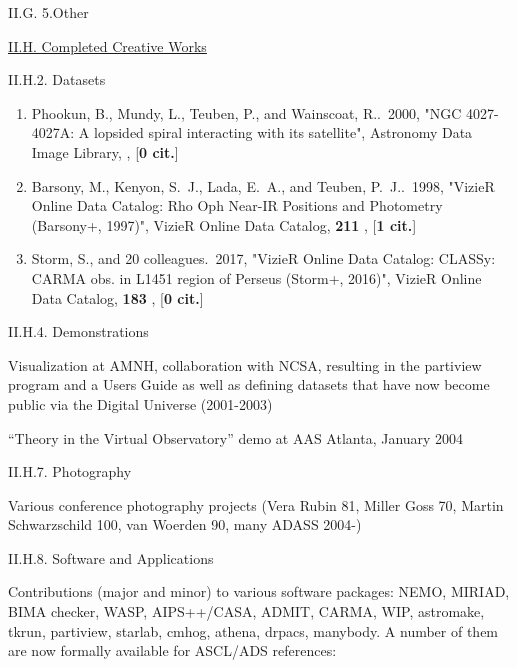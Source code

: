 \documentclass[11pt,letterpaper]{article}
\begin{document}
II.G. 5.Other


\underline{II.H. Completed Creative Works}



II.H.2. Datasets

\begin{enumerate}[resume,label=\textbf{\arabic*}.]
\item  
Phookun, B., Mundy, L., Teuben, P., and Wainscoat, R..\  2000,  "NGC 
4027-4027A: A lopsided spiral interacting with its satellite", Astronomy 
Data Image Library,  ,  [{\bf 0 cit.}] 

\item  
Barsony, M., Kenyon, S.~J., Lada, E.~A., and Teuben, P.~J..\  1998,  
"VizieR Online Data Catalog: Rho Oph Near-IR Positions and Photometry 
(Barsony+, 1997)", VizieR Online Data Catalog,  {\bf 211} ,  [{\bf 1 cit.}] 


\item  
Storm, S., and 20 colleagues.\  2017,  "VizieR Online Data Catalog: CLASSy: 
CARMA obs. in L1451 region of Perseus (Storm+, 2016)", VizieR Online Data 
Catalog,  {\bf 183} ,  [{\bf 0 cit.}] 
\end{enumerate}


II.H.4. Demonstrations

Visualization at AMNH, collaboration with NCSA, resulting in the
partiview program and a Users Guide as well as defining datasets that
have now become public via the Digital Universe (2001-2003)

``Theory in the Virtual Observatory'' demo at AAS  Atlanta, January 2004
                


II.H.7. Photography

Various conference photography projects (Vera Rubin 81, Miller Goss
70, Martin Schwarzschild 100, van Woerden 90, many ADASS 2004-)

II.H.8. Software and Applications

Contributions (major and minor) to various software packages: NEMO,
MIRIAD, BIMA checker, WASP, AIPS++/CASA, ADMIT, CARMA, WIP, astromake,
tkrun, partiview, starlab, cmhog, athena, drpacs, manybody. A number of
them are now formally available for ASCL/ADS references:
\end{document}
